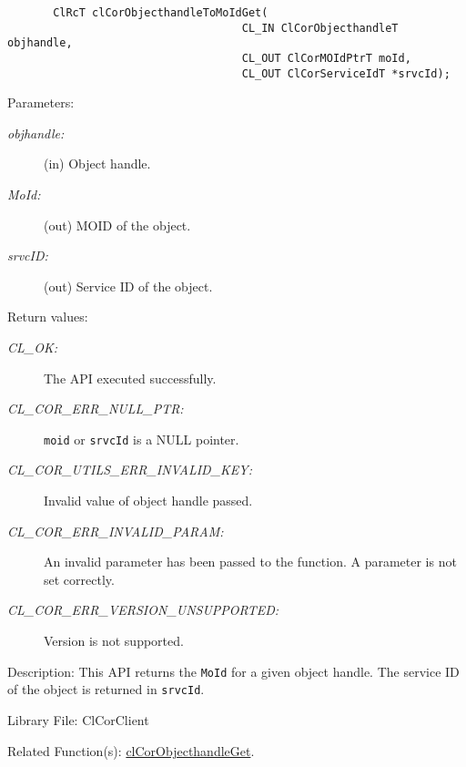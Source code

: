 \begin{flushleft}
\begin{Desc}
\footnotesize\begin{verbatim}       ClRcT clCorObjecthandleToMoIdGet(
                           			CL_IN ClCorObjecthandleT objhandle,
                           			CL_OUT ClCorMOIdPtrT moId,
                           			CL_OUT ClCorServiceIdT *srvcId);
\end{verbatim}
\normalsize
\end{Desc}
\begin{Desc}
\item[Parameters:]
\begin{description}
\item[{\em obj\-handle:}](in)  Object handle. 
\item[{\em MoId:}] (out) MOID of the object. 
\item[{\em srvc\-ID:}] (out) Service ID of the object.\end{description}
\end{Desc}
\begin{Desc}
\item[Return values:]
\begin{description}
\item[{\em CL\_\-OK:}]The API executed successfully. 
\item[{\em CL\_\-COR\_\-ERR\_\-NULL\_\-PTR:}]{\tt{moid}} or {\tt{srvcId}} is a NULL pointer. 
\item[{\em CL\_\-COR\_\-UTILS\_\-ERR\_\-INVALID\_\-KEY:}]Invalid value of object handle passed. 
\item[{\em CL\_\-COR\_\-ERR\_\-INVALID\_\-PARAM:}]An invalid parameter has been passed to the function. A parameter is not set correctly. 
\item[{\em CL\_\-COR\_\-ERR\_\-VERSION\_\-UNSUPPORTED:}] Version is not supported.\end{description}
\end{Desc}
\begin{Desc}
\item[Description:]This API returns the {\tt{MoId}} for a given object handle. The service ID of the object is returned in {\tt{srvcId}}. \end{Desc}
\begin{Desc}
\item[Library File:]Cl\-Cor\-Client\end{Desc}
\begin{Desc}
\item[Related Function(s):]\hyperlink{pagecor140}{cl\-Cor\-Object\-handle\-Get}. \end{Desc}
\newpage





\end{flushleft}
